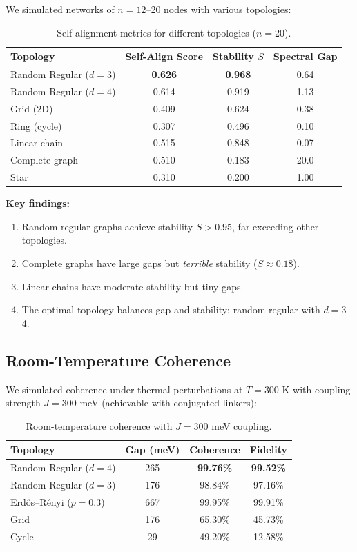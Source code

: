 \documentclass[11pt,a4paper]{article}
\theoremstyle{plain}
\theoremstyle{definition}
\theoremstyle{remark}
\begin{document}
We simulated networks of $n = 12$--20 nodes with various topologies:

\begin{table}[H]
\centering
\begin{tabular}{@{}lccc@{}}
\toprule
\textbf{Topology} & \textbf{Self-Align Score} & \textbf{Stability $S$} & \textbf{Spectral Gap} \\
\midrule
Random Regular ($d=3$) & \textbf{0.626} & \textbf{0.968} & 0.64 \\
Random Regular ($d=4$) & 0.614 & 0.919 & 1.13 \\
Grid (2D) & 0.409 & 0.624 & 0.38 \\
Ring (cycle) & 0.307 & 0.496 & 0.10 \\
Linear chain & 0.515 & 0.848 & 0.07 \\
Complete graph & 0.510 & 0.183 & 20.0 \\
Star & 0.310 & 0.200 & 1.00 \\
\bottomrule
\end{tabular}
\caption{Self-alignment metrics for different topologies ($n = 20$).}
\label{tab:topology}
\end{table}

\textbf{Key findings:}
\begin{enumerate}
    \item Random regular graphs achieve stability $S > 0.95$, far exceeding other topologies.
    \item Complete graphs have large gaps but \emph{terrible} stability ($S \approx 0.18$).
    \item Linear chains have moderate stability but tiny gaps.
    \item The optimal topology balances gap and stability: random regular with $d = 3$--4.
\end{enumerate}

\subsection{Room-Temperature Coherence}

We simulated coherence under thermal perturbations at $T = 300$ K with coupling strength $J = 300$ meV (achievable with conjugated linkers):

\begin{table}[H]
\centering
\begin{tabular}{@{}lccc@{}}
\toprule
\textbf{Topology} & \textbf{Gap (meV)} & \textbf{Coherence} & \textbf{Fidelity} \\
\midrule
Random Regular ($d=4$) & 265 & \textbf{99.76\%} & \textbf{99.52\%} \\
Random Regular ($d=3$) & 176 & 98.84\% & 97.16\% \\
Erd\H{o}s--R\'enyi ($p=0.3$) & 667 & 99.95\% & 99.91\% \\
Grid & 176 & 65.30\% & 45.73\% \\
Cycle & 29 & 49.20\% & 12.58\% \\
\bottomrule
\end{tabular}
\caption{Room-temperature coherence with $J = 300$ meV coupling.}
\label{tab:coherence}
\end{table}
\end{document}
